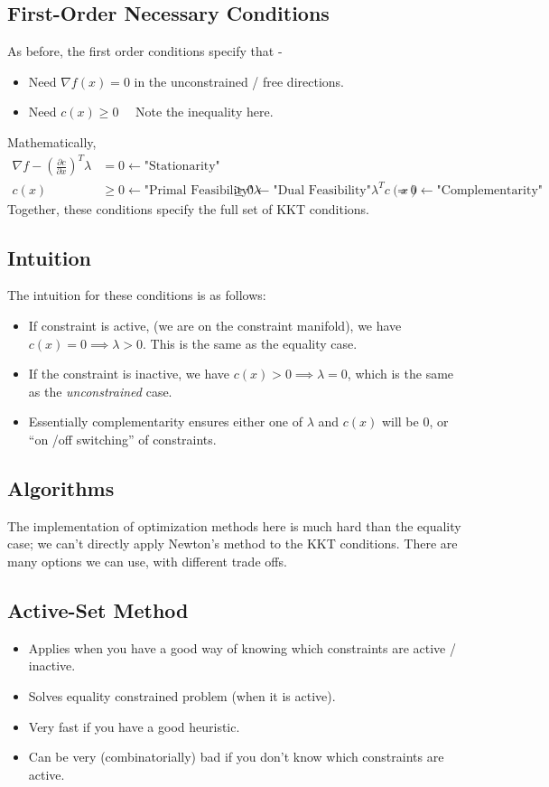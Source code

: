 \subsection{First-Order Necessary Conditions}
As before, the first order conditions specify that - 
\begin{itemize}
    \item Need $\nabla f(x) = 0$ in the unconstrained / free directions. 
    \item Need $c(x) \geq 0$ \ \ \textrm{Note the inequality here.}
\end{itemize}
Mathematically, 
\begin{align}
    \nabla f - (\frac{\partial c}{\partial x})^T \lambda &= 0 \gets \textrm{"Stationarity"} \\
    c(x) &\geq 0 \gets \textrm{"Primal Feasibility"}
    \lambda &\geq 0 \gets \textrm{"Dual Feasibility"}
    \lambda^T c(x) &= 0 \gets \textrm{"Complementarity"}
\end{align}
Together, these conditions specify the full set of KKT conditions. 

\subsection{Intuition}
The intuition for these conditions is as follows: 
\begin{itemize}
    \item If constraint is active, (we are on the constraint manifold), we have $c(x) = 0 \implies \lambda > 0$. This is the same as the equality case. 
    \item If the constraint is inactive, we have $c(x)>0 \implies \lambda = 0$, which is the same as the \textit{unconstrained} case. 
    \item Essentially complementarity ensures either one of $\lambda$ and $c(x)$ will be $0$, or ``on /off switching'' of constraints.
\end{itemize}

\subsection{Algorithms}
The implementation of optimization methods here is much hard than the equality case; we can't directly apply Newton's method to the KKT conditions. There are many options we can use, with different trade offs. 

\subsection{Active-Set Method}
\begin{itemize}
    \item Applies when you have a good way of knowing which constraints are active / inactive.
    \item Solves equality constrained problem (when it is active). 
    \item Very fast if you have a good heuristic. 
    \item Can be very (combinatorially) bad if you don't know which constraints are active. 
\end{itemize}

